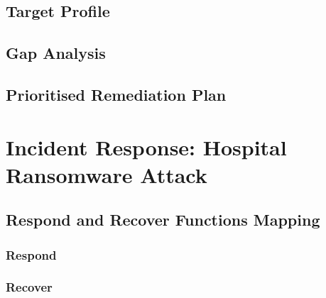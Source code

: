 
\subsection{Target Profile}




\subsection{Gap Analysis}




\subsection{Prioritised Remediation Plan}



\section{Incident Response: Hospital Ransomware Attack}



\subsection{Respond and Recover Functions Mapping}

\subsubsection{Respond}


\subsubsection{Recover}


